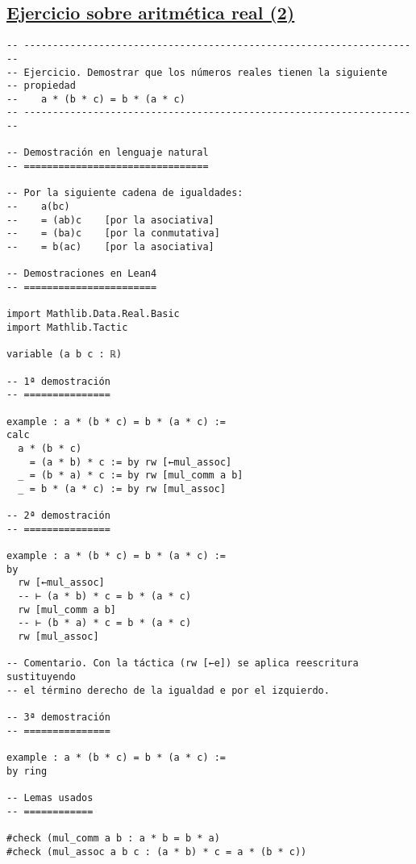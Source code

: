 \subsection{\href{./src/Basicos/Ejercicio\_sobre\_aritmetica\_real\_2.lean}{Ejercicio sobre aritmética real (2)}}
\label{sec:org5350444}
\begin{verbatim}
-- ---------------------------------------------------------------------
-- Ejercicio. Demostrar que los números reales tienen la siguiente
-- propiedad
--    a * (b * c) = b * (a * c)
-- ---------------------------------------------------------------------

-- Demostración en lenguaje natural
-- ================================

-- Por la siguiente cadena de igualdades:
--    a(bc)
--    = (ab)c    [por la asociativa]
--    = (ba)c    [por la conmutativa]
--    = b(ac)    [por la asociativa]

-- Demostraciones en Lean4
-- =======================

import Mathlib.Data.Real.Basic
import Mathlib.Tactic

variable (a b c : ℝ)

-- 1ª demostración
-- ===============

example : a * (b * c) = b * (a * c) :=
calc
  a * (b * c)
    = (a * b) * c := by rw [←mul_assoc]
  _ = (b * a) * c := by rw [mul_comm a b]
  _ = b * (a * c) := by rw [mul_assoc]

-- 2ª demostración
-- ===============

example : a * (b * c) = b * (a * c) :=
by
  rw [←mul_assoc]
  -- ⊢ (a * b) * c = b * (a * c)
  rw [mul_comm a b]
  -- ⊢ (b * a) * c = b * (a * c)
  rw [mul_assoc]

-- Comentario. Con la táctica (rw [←e]) se aplica reescritura sustituyendo
-- el término derecho de la igualdad e por el izquierdo.

-- 3ª demostración
-- ===============

example : a * (b * c) = b * (a * c) :=
by ring

-- Lemas usados
-- ============

#check (mul_comm a b : a * b = b * a)
#check (mul_assoc a b c : (a * b) * c = a * (b * c))
\end{verbatim}

